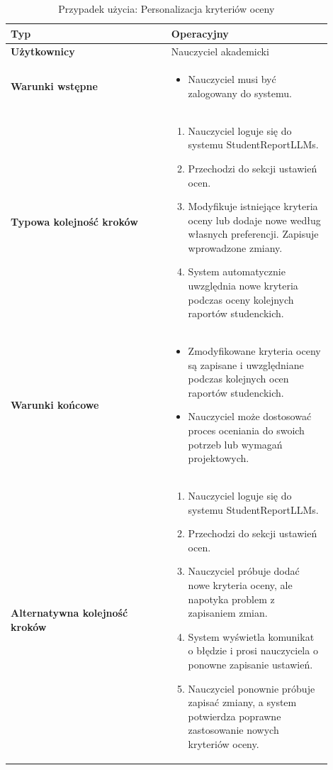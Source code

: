 \documentclass[a4paper, 12pt]{article}
\begin{document}
\begin{table}[H]
\footnotesize
\centering
\caption{Przypadek użycia: Personalizacja kryteriów oceny}
\begin{tabular}{|p{0.45\linewidth}|p{0.45\linewidth}|}
\hline
\textbf{Typ} & Operacyjny \\
\hline
\textbf{Użytkownicy} & Nauczyciel akademicki \\
\hline
\textbf{Warunki wstępne} & 
\begin{itemize}
    \item Nauczyciel musi być zalogowany do systemu.
\end{itemize} \\
\hline
\textbf{Typowa kolejność kroków} &
\begin{enumerate}
    \item Nauczyciel loguje się do systemu StudentReportLLMs.
    \item Przechodzi do sekcji ustawień ocen.
    \item Modyfikuje istniejące kryteria oceny lub dodaje nowe według własnych preferencji. Zapisuje wprowadzone zmiany.
    \item System automatycznie uwzględnia nowe kryteria podczas oceny kolejnych raportów studenckich.
\end{enumerate} \\
\hline
\textbf{Warunki końcowe} & 
\begin{itemize}
    \item Zmodyfikowane kryteria oceny są zapisane i uwzględniane podczas kolejnych ocen raportów studenckich.
    \item Nauczyciel może dostosować proces oceniania do swoich potrzeb lub wymagań projektowych.
\end{itemize} \\
\hline
\textbf{Alternatywna kolejność kroków} &
\begin{enumerate}
    \item Nauczyciel loguje się do systemu StudentReportLLMs.
    \item Przechodzi do sekcji ustawień ocen.
    \item Nauczyciel próbuje dodać nowe kryteria oceny, ale napotyka problem z zapisaniem zmian.
    \item System wyświetla komunikat o błędzie i prosi nauczyciela o ponowne zapisanie ustawień.
    \item Nauczyciel ponownie próbuje zapisać zmiany, a system potwierdza poprawne zastosowanie nowych kryteriów oceny.
\end{enumerate} \\

\end{tabular}
\end{table}
\end{document}
